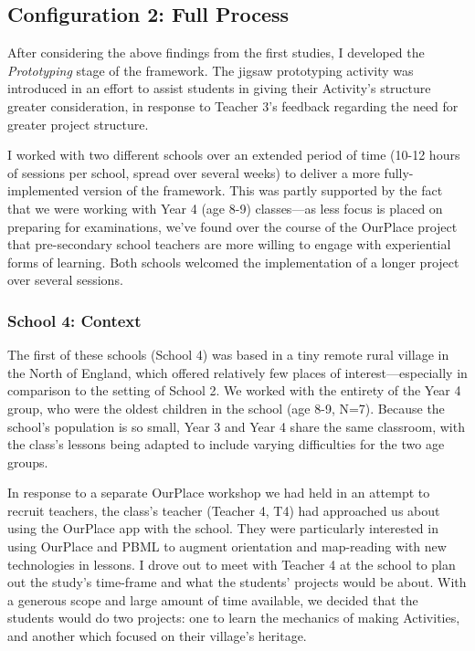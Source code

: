 \subsection{Configuration 2: Full Process}

After considering the above findings from the first studies, I developed the \textit{Prototyping} stage of the framework. The jigsaw prototyping activity was introduced in an effort to assist students in giving their Activity's structure greater consideration, in response to Teacher 3's feedback regarding the need for greater project structure.

I worked with two different schools over an extended period of time (10-12 hours of sessions per school, spread over several weeks) to deliver a more fully-implemented version of the framework. This was partly supported by the fact that we were working with Year 4 (age 8-9) classes---as less focus is placed on preparing for examinations, we've found over the course of the OurPlace project that pre-secondary school teachers are more willing to engage with experiential forms of learning. Both schools welcomed the implementation of a longer project over several sessions.

\subsubsection{School 4: Context}

The first of these schools (School 4) was based in a tiny remote rural village in the North of England, which offered relatively few places of interest---especially in comparison to the setting of School 2. We worked with the entirety of the Year 4 group, who were the oldest children in the school (age 8-9, N=7). Because the school's population is so small, Year 3 and Year 4 share the same classroom, with the class's lessons being adapted to include varying difficulties for the two age groups. 

In response to a separate OurPlace workshop we had held in an attempt to recruit teachers, the class's teacher (Teacher 4, T4) had approached us about using the OurPlace app with the school. They were particularly interested in using OurPlace and PBML to augment orientation and map-reading with new technologies in lessons. I drove out to meet with Teacher 4 at the school to plan out the study's time-frame and what the students' projects would be about. With a generous scope and large amount of time available, we decided that the students would do two projects: one to learn the mechanics of making Activities, and another which focused on their village's heritage. 

